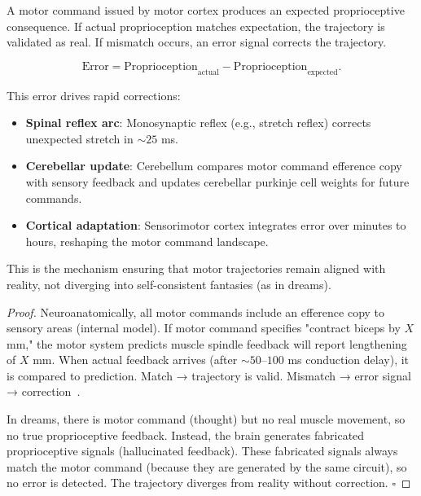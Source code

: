 \begin{theorem}
\label{thm:proprioceptive-validation}
A motor command issued by motor cortex produces an expected proprioceptive consequence. If actual proprioception matches expectation, the trajectory is validated as real. If mismatch occurs, an error signal corrects the trajectory.

\begin{equation}
  \text{Error} = \text{Proprioception}_{\text{actual}} - \text{Proprioception}_{\text{expected}}.
\end{equation}

This error drives rapid corrections:
\begin{itemize}[noitemsep]
\item \textbf{Spinal reflex arc}: Monosynaptic reflex (e.g., stretch reflex) corrects unexpected stretch in $\sim 25$ ms.
\item \textbf{Cerebellar update}: Cerebellum compares motor command efference copy with sensory feedback and updates cerebellar purkinje cell weights for future commands.
\item \textbf{Cortical adaptation}: Sensorimotor cortex integrates error over minutes to hours, reshaping the motor command landscape.
\end{itemize}

This is the mechanism ensuring that motor trajectories remain aligned with reality, not diverging into self-consistent fantasies (as in dreams).
\end{theorem}

\begin{proof}
Neuroanatomically, all motor commands include an efference copy to sensory areas (internal model). If motor command specifies "contract biceps by $X$ mm," the motor system predicts muscle spindle feedback will report lengthening of $X$ mm. When actual feedback arrives (after $\sim 50$--$100$ ms conduction delay), it is compared to prediction. Match → trajectory is valid. Mismatch → error signal → correction~\cite{WolpertWolpert1998,CereballumPerception2002}.

In dreams, there is motor command (thought) but no real muscle movement, so no true proprioceptive feedback. Instead, the brain generates fabricated proprioceptive signals (hallucinated feedback). These fabricated signals always match the motor command (because they are generated by the same circuit), so no error is detected. The trajectory diverges from reality without correction. $\square$
\end{proof}

